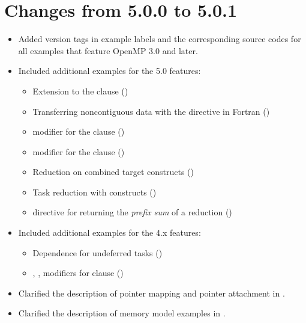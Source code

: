 \section{Changes from 5.0.0 to 5.0.1}
\label{sec:history_50_to_501}

\begin{itemize}
\item Added version tags  in example labels 
and the corresponding source codes for all examples that feature
OpenMP 3.0 and later. 

\item Included additional examples for the 5.0 features:

\begin{itemize}
\item Extension to the  clause
()
\item Transferring noncontiguous data with the  directive in Fortran ()
\item {} modifier for the  clause                             ()
\item {} modifier for the  clause                                      ()
\item Reduction on combined target constructs                                                     ()
\item Task reduction with  constructs 
   ()
\item {} directive for returning the \emph{prefix sum} of a reduction                  ()

\end{itemize}

\item Included additional examples for the 4.x features:

\begin{itemize}
\item Dependence for undeferred tasks
()
\item {}, ,  modifiers for  clause ()

\end{itemize}

\item Clarified the description of pointer mapping and pointer attachment in 
.
\item Clarified the description of memory model examples
in .

\end{itemize}


